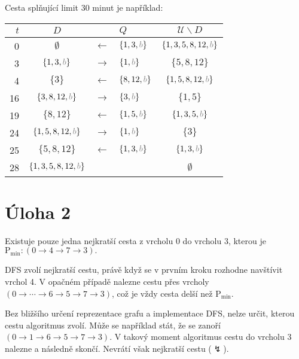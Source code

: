 \documentclass{article}
\newcommand{\U}{\mathcal{U}}
\newcommand{\myb}{{\color{gray} b}}
\newcommand{\Pmin}{\text{P}_\text{min}}
\begin{document}
Cesta splňující limit 30 minut je například:
\begin{center}
    \begin{tabular}{ r c c l c }
        $t$ & $D$                        &               & $Q$               & $\U \smallsetminus D$      \\
        \hline
        0   & $\emptyset$                & $\leftarrow$  & $\{1,3, \myb\}$   & $\{1, 3, 5, 8, 12, \myb\}$ \\[2mm]
        3   & $\{1, 3, \myb\}$           & $\rightarrow$ & $\{1, \myb\}$     & $\{5, 8, 12\}$             \\[2mm]
        4   & $\{3\}$                    & $\leftarrow$  & $\{8, 12, \myb\}$ & $\{1, 5, 8, 12, \myb\}$    \\[2mm]
        16  & $\{3, 8, 12, \myb\}$       & $\rightarrow$ & $\{3, \myb\}$     & $\{1, 5\}$                 \\[2mm]
        19  & $\{8, 12\}$                & $\leftarrow$  & $\{1, 5, \myb\}$  & $\{1, 3, 5, \myb\}$        \\[2mm]
        24  & $\{1, 5, 8, 12, \myb\}$    & $\rightarrow$ & $\{1, \myb\}$     & $\{3\}$                    \\[2mm]
        25  & $\{5, 8, 12\}$             & $\leftarrow$  & $\{1,3, \myb\}$   & $\{1, 3, \myb\}$           \\[2mm]
        28  & $\{1, 3, 5, 8, 12, \myb\}$ &               &                   & $\emptyset$                \\[2mm]
    \end{tabular}
\end{center}

\section*{Úloha 2}

Existuje pouze jedna nejkratší cesta z vrcholu 0 do vrcholu 3, kterou je
\(
\Pmin: (0 \rightarrow 4 \rightarrow 7 \rightarrow 3).
\)

DFS zvolí nejkratší cestu, právě když se v prvním kroku rozhodne navštívit vrchol 4.
V opačném případě nalezne cestu přes vrcholy $(0 \rightarrow \cdots \rightarrow 6 \rightarrow 5 \rightarrow 7 \rightarrow 3)$,
což je vždy cesta delší než $\Pmin$.

Bez bližšího určení reprezentace grafu a implementace DFS, nelze určit, kterou cestu algoritmus zvolí. Může se například stát, že se zanoří $(0 \rightarrow 1 \rightarrow 6 \rightarrow 5 \rightarrow 7 \rightarrow 3)$. V takový moment algoritmus cestu do vrcholu 3 nalezne a následně skončí. Nevrátí však nejkratší cestu ($\lightning$).
\end{document}
